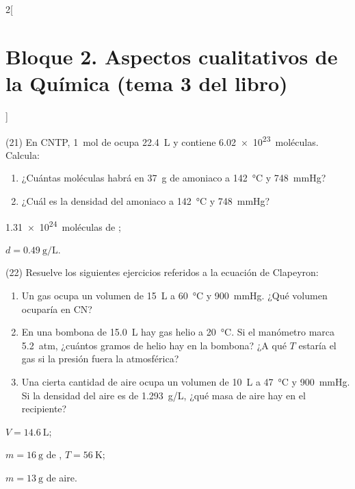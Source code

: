 \documentclass[10pt]{article}
\begin{document}
\begin{multicols}{2}[
    \section{Bloque 2. Aspectos cualitativos de la Química (tema 3 del libro)}
  ]
\begin{exercise}[
    tags    = {},
    topics  = {química,química básica},
    source  = {FQ 1B MGH 2016, p84, e21},
  ]
  (21) En CNTP, \SI{1}{mol} de  ocupa \SI{22.4}{\liter} y contiene \SI{6.02e23}{moléculas}. Calcula:
  \begin{enumerate}
    \item ¿Cuántas moléculas habrá en \SI{37}{\gram} de amoniaco a \SI{142}{\celsius} y \SI{748}{\mmHg}?
    \item ¿Cuál es la densidad del amoniaco a \SI{142}{\celsius} y \SI{748}{\mmHg}?
  \end{enumerate}
\end{exercise}

\begin{solution}
  \begin{enumerate*}
    \item \SI{1.31e24}{moléculas} de ; \item \( d = \SI{0.49}{\gram\per\liter} \).
  \end{enumerate*}
\end{solution}




\begin{exercise}[
    tags    = {},
    topics  = {química,química básica},
    source  = {FQ 1B MGH 2016, p84, e22},
  ]
  (22) Resuelve los siguientes ejercicios referidos a la ecuación de Clapeyron:
  \begin{enumerate}
    \item Un gas ocupa un volumen de \SI{15}{\liter} a \SI{60}{\celsius} y \SI{900}{\mmHg}. ¿Qué volumen ocuparía en CN?
    \item En una bombona de \SI{15.0}{\liter} hay gas helio a \SI{20}{\celsius}. Si el manómetro marca \SI{5.2}{atm}, ¿cuántos gramos de helio hay en la bombona? ¿A qué \( T \) estaría el gas si la presión fuera la atmosférica?
    \item Una cierta cantidad de aire ocupa un volumen de \SI{10}{\liter} a \SI{47}{\celsius} y \SI{900}{\mmHg}. Si la densidad del aire es de \SI{1.293}{g/L}, ¿qué masa de aire hay en el recipiente?
  \end{enumerate}
\end{exercise}

\begin{solution}
  \begin{enumerate*}
    \item \( V = \SI{14.6}{\liter} \);
    \item \( m = \SI{16}{\gram} \) de , \( T = \SI{56}{\kelvin} \); \item \( m = \SI{13}{\gram} \) de aire.
  \end{enumerate*}
\end{solution}







\end{multicols}
\end{document}
